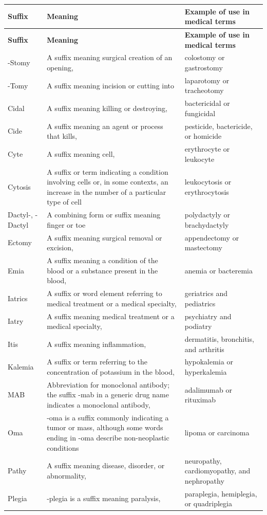 \small
\setlength{\LTleft}{0pt}
\setlength{\LTright}{0pt}
\begin{longtable}{>{\raggedright\arraybackslash}p{} >{\raggedright\arraybackslash}p{} >{\raggedright\arraybackslash}p{}}
\toprule
\textbf{Suffix} & \textbf{Meaning} & \textbf{Example of use in medical terms} \\
\midrule
\endfirsthead
\toprule
\textbf{Suffix} & \textbf{Meaning} & \textbf{Example of use in medical terms} \\
\midrule
\endhead
\bottomrule
\endfoot
-Stomy & A suffix meaning surgical creation of an opening, & colostomy or gastrostomy \\
-Tomy & A suffix meaning incision or cutting into & laparotomy or tracheotomy \\
Cidal & A suffix meaning killing or destroying, & bactericidal or fungicidal \\
Cide & A suffix meaning an agent or process that kills, & pesticide, bactericide, or homicide \\
Cyte & A suffix meaning cell, & erythrocyte or leukocyte \\
Cytosis & A suffix or term indicating a condition involving cells or, in some contexts, an increase in the number of a particular type of cell & leukocytosis or erythrocytosis \\
Dactyl-, -Dactyl & A combining form or suffix meaning finger or toe & polydactyly or brachydactyly \\
Ectomy & A suffix meaning surgical removal or excision, & appendectomy or mastectomy \\
Emia & A suffix meaning a condition of the blood or a substance present in the blood, & anemia or bacteremia \\
Iatrics & A suffix or word element referring to medical treatment or a medical specialty, & geriatrics and pediatrics \\
Iatry & A suffix meaning medical treatment or a medical specialty, & psychiatry and podiatry \\
Itis & A suffix meaning inflammation, & dermatitis, bronchitis, and arthritis \\
Kalemia & A suffix or term referring to the concentration of potassium in the blood, & hypokalemia or hyperkalemia \\
MAB & Abbreviation for monoclonal antibody; the suffix -mab in a generic drug name indicates a monoclonal antibody, & adalimumab or rituximab \\
Oma & -oma is a suffix commonly indicating a tumor or mass, although some words ending in -oma describe non-neoplastic conditions & lipoma or carcinoma \\
Pathy & A suffix meaning disease, disorder, or abnormality, & neuropathy, cardiomyopathy, and nephropathy \\
Plegia & -plegia is a suffix meaning paralysis, & paraplegia, hemiplegia, or quadriplegia \\
\bottomrule
\end{longtable}
